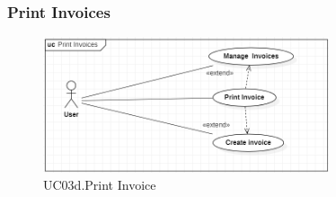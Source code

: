 \documentclass[../thesis.tex]{subfiles}
\begin{document}
\subsubsection{Print Invoices}
\begin{figure}[H]
    \centering
    \includegraphics[width=0.75\textwidth]{images/UCD_PrintInvoice.png}
    \caption{UC03d.Print Invoice}
    \label{fig:UCD-print-invoice}
\end{figure}
\end{document}
